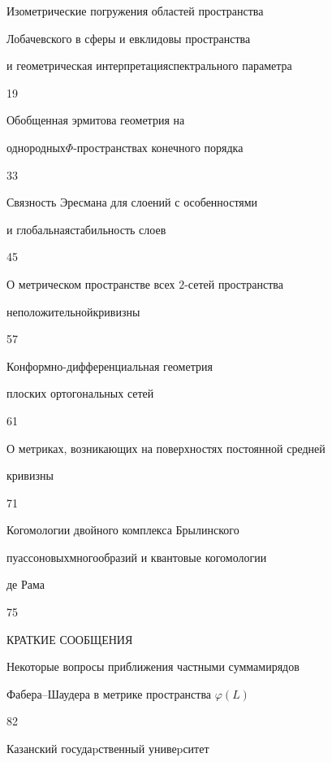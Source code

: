 

{Изометрические погружения областей пространства\newline


Лобачевского в сферы и евклидовы пространства


и геометрическая интерпретация\newline  спектрального параметра}{19}




{Обобщенная эрмитова геометрия на


однородных\newline $\Phi$-пространствах конечного порядка}{33}




{Связность Эресмана для слоений с особенностями


и глобальная\newline стабильность слоев}{45}




{О метрическом пространстве всех $2$-сетей пространства


неположительной\newline кривизны}{57}




{Конформно-дифференциальная геометрия


плоских ортогональных сетей}{61}




{О метриках, возникающих на поверхностях постоянной средней  


кривизны}{71}




{Когомологии двойного комплекса Брылинского


пуассоновых\newline многообразий и квантовые когомологии


де Рама}{75}








\bigskip





\begin{center}


КРАТКИЕ СООБЩЕНИЯ


\end{center}







{Некоторые вопросы приближения частными суммами\newline рядов


Фабера--Шаудера в метрике пространства $\varphi(L)$}{82}











\vfill


\noindent\raisebox{2pt}{\copyright} Казанский госудаpственный унивеpситет





